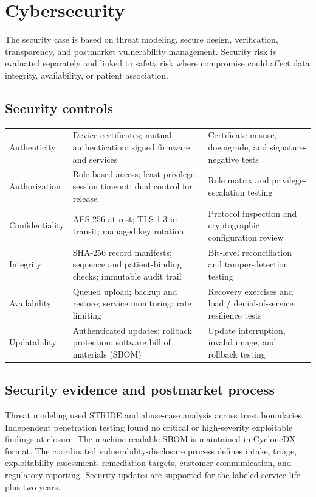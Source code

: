 \section{Cybersecurity}

The security case is based on threat modeling, secure design, verification, transparency, and postmarket vulnerability management. Security risk is evaluated separately and linked to safety risk where compromise could affect data integrity, availability, or patient association.

\subsection{Security controls}
\begin{tabularx}{\textwidth}{@{}L{1.42in}Y Y@{}}
\toprule
{} &  &  \\
\midrule
Authenticity & Device certificates; mutual authentication; signed firmware and services & Certificate misuse, downgrade, and signature-negative tests \\
Authorization & Role-based access; least privilege; session timeout; dual control for release & Role matrix and privilege-escalation testing \\
Confidentiality & AES-256 at rest; TLS 1.3 in transit; managed key rotation & Protocol inspection and cryptographic configuration review \\
Integrity & SHA-256 record manifests; sequence and patient-binding checks; immutable audit trail & Bit-level reconciliation and tamper-detection testing \\
Availability & Queued upload; backup and restore; service monitoring; rate limiting & Recovery exercises and load / denial-of-service resilience tests \\
Updatability & Authenticated updates; rollback protection; software bill of materials (SBOM) & Update interruption, invalid image, and rollback testing \\
\bottomrule
\end{tabularx}

\subsection{Security evidence and postmarket process}
Threat modeling used STRIDE and abuse-case analysis across trust boundaries. Independent penetration testing found no critical or high-severity exploitable findings at closure. The machine-readable SBOM is maintained in CycloneDX format. The coordinated vulnerability-disclosure process defines intake, triage, exploitability assessment, remediation targets, customer communication, and regulatory reporting. Security updates are supported for the labeled service life plus two years.

